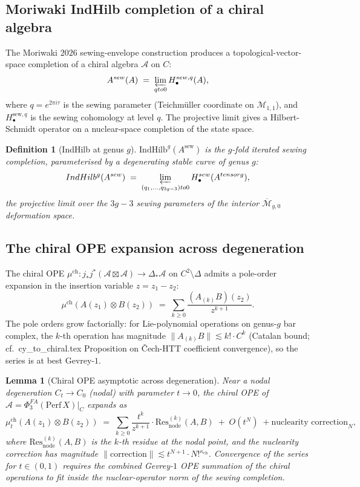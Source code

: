 \documentclass[11pt]{amsart}
\newtheorem{lemma}[theorem]{Lemma}
\newtheorem{definition}[theorem]{Definition}
\newcommand{\kch}{\kappa_{\mathrm{ch}}}
\newcommand{\cA}{\mathcal{A}}
\newcommand{\cM}{\mathcal{M}}
\newcommand{\IndHilb}{\mathrm{IndHilb}}
\newcommand{\Mbar}{\overline{\mathcal{M}}}
\newcommand{\Perf}{\mathrm{Perf}}
\begin{document}
\subsection{Moriwaki IndHilb completion of a chiral algebra}

The Moriwaki $2026$ sewing-envelope construction produces a
topological-vector-space completion of a chiral algebra $\cA$ on
$C$:
\[
A^{\mathrm{sew}}(\cA) \;=\; \varprojlim_{q \to 0}
H_\bullet^{\mathrm{sew}, q}(\cA),
\]
where $q = e^{2\pi i\tau}$ is the sewing parameter (Teichmüller
coordinate on $\cM_{1,1}$), and $H_\bullet^{\mathrm{sew}, q}$ is
the sewing cohomology at level $q$. The projective limit gives a
Hilbert-Schmidt operator on a nuclear-space completion of the
state space.

\begin{definition}[IndHilb at genus $g$]
\label{def:indhilb-genus-g}
$\IndHilb^g(A^{\mathrm{sew}})$ is the $g$-fold iterated sewing
completion, parameterised by a degenerating stable curve of genus
$g$:
\[
\IndHilb^g(A^{\mathrm{sew}}) \;=\; \varprojlim_{(q_1, \dots, q_{3g-3})
\to 0} H_\bullet^{\mathrm{sew}}(\cA^{\otimes g}),
\]
the projective limit over the $3g-3$ sewing parameters of the
interior $\Mbar_{g,0}$ deformation space.
\end{definition}

\subsection{The chiral OPE expansion across degeneration}

The chiral OPE $\mu^{\mathrm{ch}} : j_\ast j^\ast(\cA \boxtimes \cA)
\to \Delta_\ast \cA$ on $C^2 \setminus \Delta$ admits a pole-order
expansion in the insertion variable $z = z_1 - z_2$:
\[
\mu^{\mathrm{ch}}(A(z_1) \otimes B(z_2)) \;=\;
\sum_{k \geq 0} \frac{(A_{(k)} B)(z_2)}{z^{k+1}}.
\]
The pole orders grow factorially: for Lie-polynomial operations on
genus-$g$ bar complex, the $k$-th operation has magnitude
$\|A_{(k)} B\| \lesssim k! \cdot C^k$ (Catalan bound;
cf.\ cy\_to\_chiral.tex Proposition on \v{C}ech-HTT coefficient
convergence), so the series is at best Gevrey-$1$.

\begin{lemma}[Chiral OPE asymptotic across degeneration]
\label{lem:chiral-ope-asymptotic}
Near a nodal degeneration $C_{t} \to C_0$ (nodal) with parameter $t
\to 0$, the chiral OPE of $\cA = \Phi^{FA}_3(\Perf\,X)|_C$
expands as
\[
\mu^{\mathrm{ch}}_t(A(z_1) \otimes B(z_2)) \;=\;
\sum_{k \geq 0} \frac{t^{k}}{z^{k+1}}
\cdot \mathrm{Res}_{\mathrm{node}}^{(k)}(A, B) \;+\; O(t^N) \;+
\text{nuclearity correction}_N,
\]
where $\mathrm{Res}_{\mathrm{node}}^{(k)}(A, B)$ is the $k$-th
residue at the nodal point, and the nuclearity correction has
magnitude
$\|\text{correction}\| \lesssim t^{N+1} \cdot N!^{\kch}$.
Convergence of the series for $t \in (0, 1)$ requires the
combined Gevrey-$1$ OPE summation of the chiral operations to
fit inside the nuclear-operator norm of the sewing completion.
\end{lemma}
\end{document}
